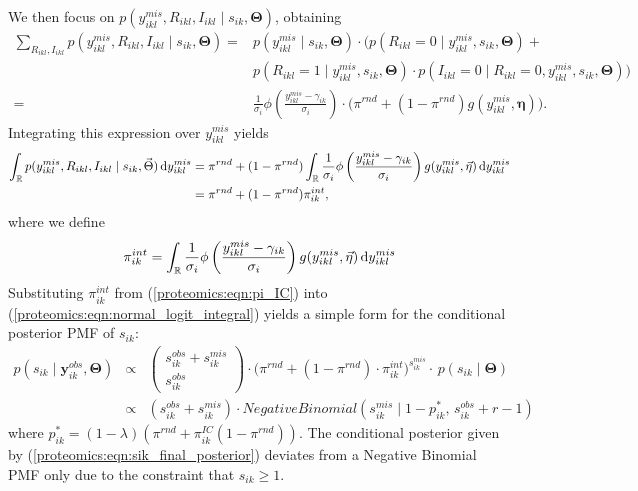 We then focus on $p(y_{ikl}^{mis}, R_{ikl},I_{ikl} \mid s_{ik}, \bm{\Theta})$, obtaining
\begin{align}
\nonumber
\sum_{R_{ikl},I_{ikl}} p(y_{ikl}^{mis}, R_{ikl},I_{ikl} \mid s_{ik}, \bm{\Theta})  =& 
p(y_{ikl}^{mis} \mid s_{ik}, \bm{\Theta}) \cdot \Big(
p(R_{ikl} = 0 \mid y_{ikl}^{mis}, s_{ik}, \bm{\Theta}) + \\
& p(R_{ikl} = 1 \mid y_{ikl}^{mis}, s_{ik}, \bm{\Theta})\cdot
p(I_{ikl} = 0 \mid R_{ikl}=0, y_{ikl}^{mis}, s_{ik}, \bm{\Theta}) \Big) \\
=& \frac{1}{\sigma_i} \phi\left( \frac{y_{ikl}^{mis} - \gamma_{ik}}{\sigma_{i}} \right) \cdot \Big( \pi^{rnd} + (1-\pi^{rnd}) g(y_{ikl}^{mis}, \bm \eta) \Big).
\end{align}
%
Integrating this expression over $y_{ikl}^{mis}$ yields
%
\begin{align}
\int_\Reals p(y_{ikl}^{mis}, R_{ikl},I_{ikl} \mid s_{ik}, \bm{\Theta}) \, \mathrm{d}y_{ikl}^{mis} &=
\pi^{rnd} +
(1-\pi^{rnd}) \int_\Reals \frac{1}{\sigma_i} \phi\left( \frac{y_{ikl}^{mis} - \gamma_{ik}}{\sigma_{i}} \right) g(y_{ikl}^{mis}, \bm \eta) \, \mathrm{d}y_{ikl}^{mis}  \label{proteomics:eqn:normal_logit_integral} \\
&= \pi^{rnd} + (1 - \pi^{rnd}) \pi^{int}_{ik},
\end{align}
%
where we define
\begin{equation}
\pi^{int}_{ik} = \int_\Reals \frac{1}{\sigma_i} \phi\left( \frac{y_{ikl}^{mis} - \gamma_{ik}}{\sigma_{i}} \right) g(y_{ikl}^{mis}, \bm \eta) \, \mathrm{d}y_{ikl}^{mis} \label{proteomics:eqn:pi_IC}
\end{equation}
Substituting $\pi^{int}_{ik}$ from (\ref{proteomics:eqn:pi_IC}) into (\ref{proteomics:eqn:normal_logit_integral}) yields a simple form for the conditional posterior PMF of $s_{ik}$: 
\begin{eqnarray}
\nonumber
p( s_{ik} \mid \bm{y}_{ik}^{obs}, \bm{\Theta} ) & \propto & 
\left(\begin{array}{c}
s_{ik}^{obs}+s_{ik}^{mis}\\
s_{ik}^{obs}
\end{array}\right) \cdot \Big( \pi^{rnd} + (1-\pi^{rnd}) \cdot \pi^{int}_{ik} \Big)^{s_{ik}^{mis}} \cdot \,  p(s_{ik} \mid \bm{\Theta}) \\
& \propto & 
(s_{ik}^{obs} + s_{ik}^{mis}) \cdot NegativeBinomial(s_{ik}^{mis} \mid 1-p_{ik}^*, \, s_{ik}^{obs} + r - 1) \label{proteomics:eqn:sik_final_posterior}
\end{eqnarray}
where $p_{ik}^* = (1-\lambda)(\pi^{rnd} + \pi_{ik}^{IC}(1-\pi^{rnd}))$.
%
The conditional posterior given by (\ref{proteomics:eqn:sik_final_posterior}) deviates from a Negative Binomial PMF only due to the constraint that $s_{ik} \geq 1$.

